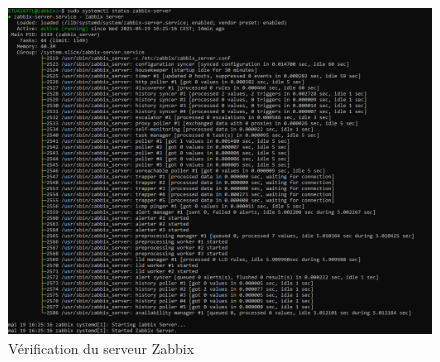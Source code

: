 \documentclass[a4paper]{article}
\begin{document}
\begin{figure}[H]
  \centering
  \includegraphics[width=12cm]{images/Rapport/zabbix/status_zabbix.png}
  \caption{Vérification du serveur Zabbix}
\end{figure}
\end{document}
